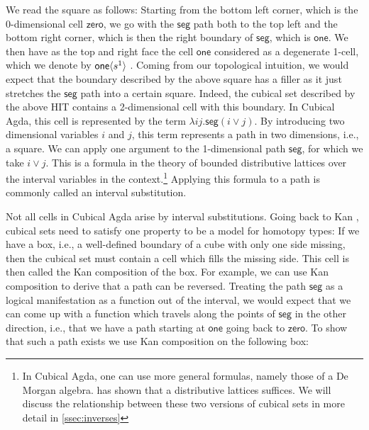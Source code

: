 \documentclass[11pt]{article}
\theoremstyle{definition}
\newcommand{\smap}[1]{s^{{#1}}}
\newcommand{\cont}[2]{\ensuremath{ \ifthenelse{\equal{#2}{}}{#1}{{#1}\langle{#2}\rangle}} }
\newcommand{\cset}[1]{\ensuremath{\mathsf{{#1}}}}
\begin{document}
We read the square as follows: Starting from the bottom left corner, which is
the 0-dimensional cell \cset{zero}, we go with the \cset{seg} path both to the
top left and the bottom right corner, which is then the right boundary of
\cset{seg}, which is \cset{one}. We then have as the top and right face 
the cell \cset{one} considered as a degenerate 1-cell, which we denote by
\cont{\cset{one}}{\smap{1}}. Coming from our topological intuition, we would
expect that the boundary described by the above square has a filler as it just
stretches the \cset{seg} path into a certain square. Indeed, the cubical set
described by the above HIT contains a 2-dimensional cell with
this boundary. In Cubical Agda, this cell is represented by the term
$\lambda i j .\cset{seg} (i \vee j)$. By introducing two dimensional variables
$i$ and $j$, this term represents a path
in two dimensions, i.e., a square. We can apply one argument to the
1-dimensional path
\cset{seg}, for which we take $i \vee j$. This is a formula in the theory of
bounded distributive lattices over the interval variables in the
context.\footnote{In Cubical Agda, one can use more general formulas, namely
  those of a De Morgan algebra. \cite{orton17_axiom_model_cubic_type_theor_topos} has shown
  that a distributive lattices suffices. We will discuss the
  relationship between these two versions of cubical sets in more detail in
  \autoref{ssec:inverses}}
Applying this formula to a path is commonly called an interval substitution.

Not all cells in Cubical Agda arise by interval substitutions. Going
back to Kan \cite{kan55_abstr_homot}, cubical sets need to satisfy one property
to be a model for homotopy types: If we have a box, i.e., a
well-defined boundary of a cube with only one side missing, then the cubical set
must contain a cell
which fills the missing side. This cell is then called the Kan composition of
the box. For example, we can use Kan composition to derive that a path can be reversed. 
Treating the path \cset{seg} as a logical manifestation as a function out of the
interval, we would expect that we can come up with a function which travels
along the points of \cset{seg} in the other direction, i.e., that we have a path starting at
\cset{one} going back to \cset{zero}. To show that such a path exists we use Kan
composition on the following box:

\begin{center}
\end{center}
\end{document}
